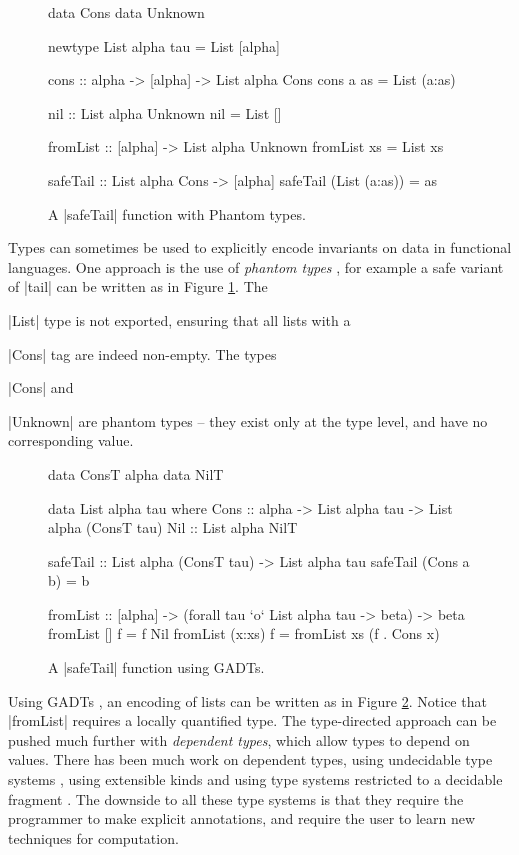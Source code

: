 \begin{figure}
\begin{code}
data Cons
data Unknown

newtype List alpha tau = List [alpha]

cons :: alpha -> [alpha] -> List alpha Cons
cons a as = List (a:as)

nil :: List alpha Unknown
nil = List []

fromList :: [alpha] -> List alpha Unknown
fromList xs = List xs

safeTail :: List alpha Cons -> [alpha]
safeTail (List (a:as)) = as
\end{code}
\caption{A |safeTail| function with Phantom types.}
\label{figC:phantom}
\end{figure}

Types can sometimes be used to explicitly encode invariants on data in functional languages. One approach is the use of \textit{phantom types} \cite{fluet:phantom}, for example a safe variant of |tail| can be written as in Figure \ref{figC:phantom}. The \ignore|List| type is not exported, ensuring that all lists with a \ignore|Cons| tag are indeed non-empty. The types \ignore|Cons| and \ignore|Unknown| are phantom types -- they exist only at the type level, and have no corresponding value.

\begin{figure}
\ignore\begin{code}
data ConsT alpha
data NilT

data List alpha tau where
    Cons  :: alpha -> List alpha tau -> List alpha (ConsT tau)
    Nil   :: List alpha NilT

safeTail :: List alpha (ConsT tau) -> List alpha tau
safeTail (Cons a b) = b

fromList :: [alpha] -> (forall tau `o` List alpha tau -> beta) -> beta
fromList []      f = f Nil
fromList (x:xs)  f = fromList xs (f . Cons x)
\end{code}
\caption{A |safeTail| function using GADTs.}
\label{figC:gadt}
\end{figure}

Using GADTs \cite{spj:gadt}, an encoding of lists can be written as in Figure \ref{figC:gadt}. Notice that |fromList| requires a locally quantified type. The type-directed approach can be pushed much further with \textit{dependent types}, which allow types to depend on values. There has been much work on dependent types, using undecidable type systems \cite{epigram}, using extensible kinds \cite{omega} and using type systems restricted to a decidable fragment \cite{xi:dependent_practical}. The downside to all these type systems is that they require the programmer to make explicit annotations, and require the user to learn new techniques for computation.


